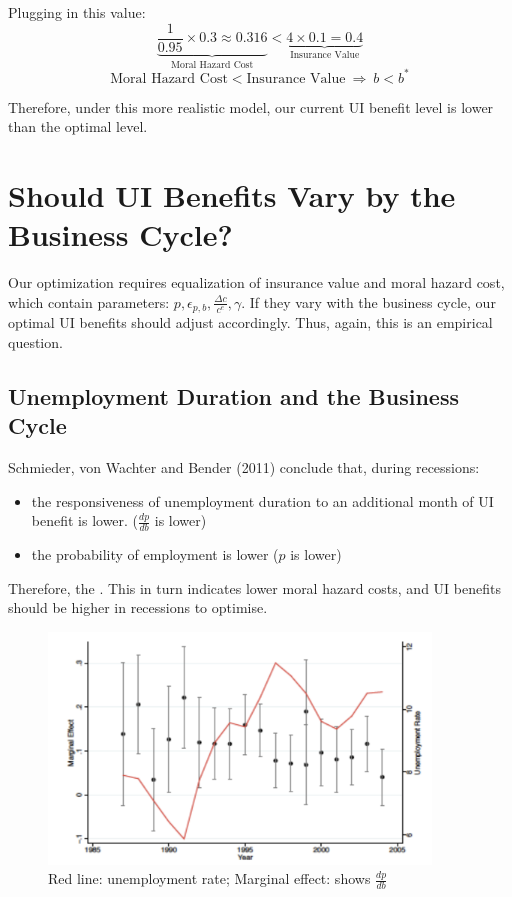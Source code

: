         Plugging in this value:
        $$\underbrace{\frac{1}{0.95}\times{0.3} \approx 0.316}_{\text{Moral\ Hazard\ Cost}} < \underbrace{4 \times 0.1 = 0.4}_{\text{Insurance\ Value}}$$
        $$\text{Moral\ Hazard\ Cost} < \text{Insurance\ Value}\ \Rightarrow\ b<b^*$$
        
        Therefore, under this more realistic model, our current UI benefit level is lower than the optimal level.
    
\section{Should UI Benefits Vary by the Business Cycle?}
    Our optimization requires equalization of insurance value and moral hazard cost, which contain parameters: $p, \epsilon_{p,b}, \frac{\Delta c}{c^e}, \gamma$. If they vary with the business cycle, our optimal UI benefits should adjust accordingly. Thus, again, this is an empirical question.
    
    \subsection{Unemployment Duration and the Business Cycle}
        Schmieder, von Wachter and Bender (2011) conclude that, during recessions:
        \begin{itemize}
            \item the responsiveness of unemployment duration to an additional month of UI benefit is lower. ($\frac{dp}{db}$ is lower)
            \item the probability of employment is lower ($p$ is lower) 
        \end{itemize}
        Therefore, the . This in turn indicates lower moral hazard costs, and UI benefits should be higher in recessions to optimise.
        \begin{figure}[H]
            \centering
            \includegraphics[width=4in]{images/ch1/Schmieder.png}
            \caption{Red line: unemployment rate; Marginal effect: shows $\frac{dp}{db}$}
        \end{figure}
        
